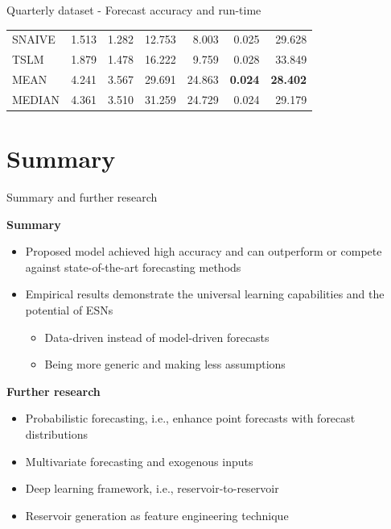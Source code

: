 \documentclass[aspectratio=169]{beamer}
\begin{document}
\begin{frame}[t]{Quarterly dataset - Forecast accuracy and run-time}
\begin{minipage}[t]{0.7\textwidth}
\begin{table}[ht]
\begin{tabular}{lrrrrrr}
				SNAIVE & 1.513 & 1.282 & 12.753 & 8.003 & 0.025 & 29.628 \\ 
				TSLM & 1.879 & 1.478 & 16.222 & 9.759 & 0.028 & 33.849 \\ 
				MEAN & 4.241 & 3.567 & 29.691 & 24.863 & \textbf{0.024} & \textbf{28.402} \\ 
				MEDIAN & 4.361 & 3.510 & 31.259 & 24.729 & 0.024 & 29.179 \\ 
				\bottomrule
			\end{tabular}
		\end{table}
    \end{minipage}
\end{frame}



\section{Summary}


\begin{frame}[t]{Summary and further research}
    \begin{minipage}[t]{0.5\textwidth}
        \vspace{0pt}
        \textbf{Summary}
        \begin{itemize}
            \item Proposed model achieved high accuracy and can outperform or compete against state-of-the-art forecasting methods
            \item Empirical results demonstrate the universal learning capabilities and the potential of ESNs
            \begin{itemize}
            	\item Data-driven instead of model-driven forecasts
            	\item Being more generic and making less assumptions
            \end{itemize}
        \end{itemize}
    \end{minipage}%
    \hfill
    \begin{minipage}[t]{0.5\textwidth}
        \vspace{0pt}
        \textbf{Further research}
        \begin{itemize}
        	\item Probabilistic forecasting, i.e., enhance point forecasts with forecast distributions
        	\item Multivariate forecasting and exogenous inputs
        	\item Deep learning framework, i.e., reservoir-to-reservoir
        	\item Reservoir generation as feature engineering technique
        \end{itemize}
    \end{minipage}
\end{frame}
\end{document}
